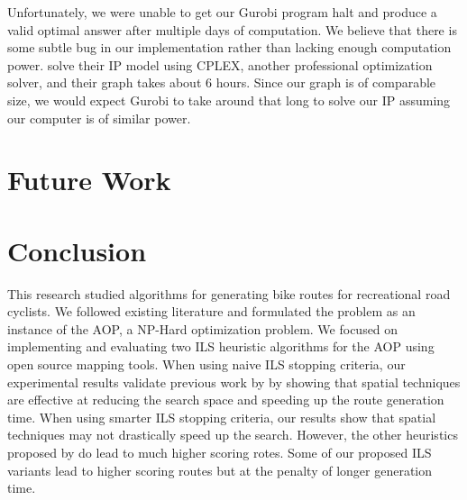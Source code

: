 \documentclass[11pt]{article}
\newcommand{\td}{\todo[inline]}
\begin{document}
Unfortunately, we were unable to get our Gurobi program halt and produce a valid optimal answer after multiple days of computation. We believe that there is some subtle bug in our implementation rather than lacking enough computation power. \citeauthor{verbeeck2014extension} solve their IP model using CPLEX, another professional optimization solver, and their graph takes about 6 hours. Since our graph is of comparable size, we would expect Gurobi to take around that long to solve our IP assuming our computer is of similar power.

\section{Future Work}
\td{Write me}

\section{Conclusion}
This research studied algorithms for generating bike routes for recreational road cyclists. We followed existing literature and formulated the problem as an instance of the AOP, a NP-Hard optimization problem. We focused on implementing and evaluating two ILS heuristic algorithms \cite{verbeeck2014extension} \cite{lu2015arc} for the AOP using open source mapping tools. When using naive ILS stopping criteria, our experimental results validate previous work by \cite{lu2015arc} by showing that spatial techniques are effective at reducing the search space and speeding up the route generation time. When using smarter ILS stopping criteria, our results show that spatial techniques may not drastically speed up the search. However, the other heuristics proposed by \cite{lu2015arc} do lead to much higher scoring rotes. Some of our proposed ILS variants lead to higher scoring routes but at the penalty of longer generation time.

\appendix
\end{document}
